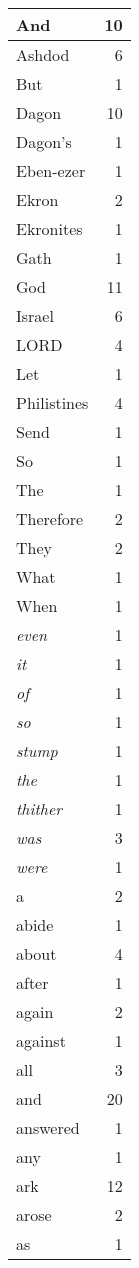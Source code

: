 \begin{center}
\begin{longtable}{l|r}
\hline \hline
\endlastfoot
And & 10 \\ \hline
Ashdod & 6 \\ \hline
But & 1 \\ \hline
Dagon & 10 \\ \hline
Dagon's & 1 \\ \hline
Eben-ezer & 1 \\ \hline
Ekron & 2 \\ \hline
Ekronites & 1 \\ \hline
Gath & 1 \\ \hline
God & 11 \\ \hline
Israel & 6 \\ \hline
LORD & 4 \\ \hline
Let & 1 \\ \hline
Philistines & 4 \\ \hline
Send & 1 \\ \hline
So & 1 \\ \hline
The & 1 \\ \hline
Therefore & 2 \\ \hline
They & 2 \\ \hline
What & 1 \\ \hline
When & 1 \\ \hline
\emph{even} & 1 \\ \hline
\emph{it} & 1 \\ \hline
\emph{of} & 1 \\ \hline
\emph{so} & 1 \\ \hline
\emph{stump} & 1 \\ \hline
\emph{the} & 1 \\ \hline
\emph{thither} & 1 \\ \hline
\emph{was} & 3 \\ \hline
\emph{were} & 1 \\ \hline
a & 2 \\ \hline
abide & 1 \\ \hline
about & 4 \\ \hline
after & 1 \\ \hline
again & 2 \\ \hline
against & 1 \\ \hline
all & 3 \\ \hline
and & 20 \\ \hline
answered & 1 \\ \hline
any & 1 \\ \hline
ark & 12 \\ \hline
arose & 2 \\ \hline
as & 1 \\ \hline

\end{longtable}
\end{center}
